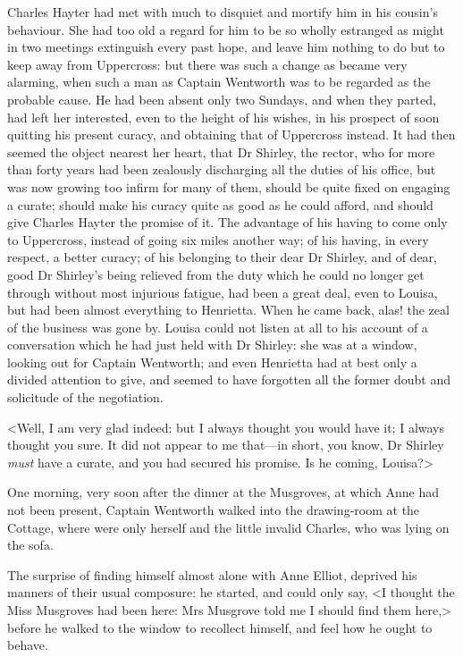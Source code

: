 Charles Hayter had met with much to disquiet and mortify him in his cousin's behaviour. She had too old a regard for him to be so wholly estranged as might in two meetings extinguish every past hope, and leave him nothing to do but to keep away from Uppercross: but there was such a change as became very alarming, when such a man as Captain Wentworth was to be regarded as the probable cause. He had been absent only two Sundays, and when they parted, had left her interested, even to the height of his wishes, in his prospect of soon quitting his present curacy, and obtaining that of Uppercross instead. It had then seemed the object nearest her heart, that Dr Shirley, the rector, who for more than forty years had been zealously discharging all the duties of his office, but was now growing too infirm for many of them, should be quite fixed on engaging a curate; should make his curacy quite as good as he could afford, and should give Charles Hayter the promise of it. The advantage of his having to come only to Uppercross, instead of going six miles another way; of his having, in every respect, a better curacy; of his belonging to their dear Dr Shirley, and of dear, good Dr Shirley's being relieved from the duty which he could no longer get through without most injurious fatigue, had been a great deal, even to Louisa, but had been almost everything to Henrietta. When he came back, alas! the zeal of the business was gone by. Louisa could not listen at all to his account of a conversation which he had just held with Dr Shirley: she was at a window, looking out for Captain Wentworth; and even Henrietta had at best only a divided attention to give, and seemed to have forgotten all the former doubt and solicitude of the negotiation.

<Well, I am very glad indeed: but I always thought you would have it; I always thought you sure. It did not appear to me that—in short, you know, Dr Shirley \textit{must} have a curate, and you had secured his promise. Is he coming, Louisa?>

One morning, very soon after the dinner at the Musgroves, at which Anne had not been present, Captain Wentworth walked into the drawing-room at the Cottage, where were only herself and the little invalid Charles, who was lying on the sofa.

The surprise of finding himself almost alone with Anne Elliot, deprived his manners of their usual composure: he started, and could only say, <I thought the Miss Musgroves had been here: Mrs Musgrove told me I should find them here,> before he walked to the window to recollect himself, and feel how he ought to behave.

